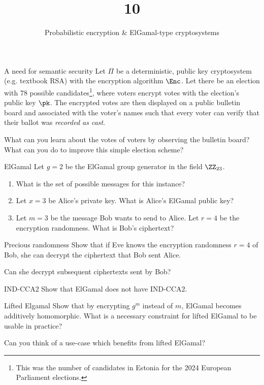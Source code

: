 \documentclass{practice}
\title{10}
\subtitle{Probabilistic encryption \& ElGamal-type cryptosystems}
\date{\DTMdate{2024-11-13}}
\begin{document}
\maketitle

\begin{task}{A need for semantic security}
  Let $\Pi$ be a deterministic, public key cryptosystem (e.g. textbook RSA) with the encryption algorithm $\Enc$.
  Let there be an election with $78$ possible candidates\footnote{This was the number of candidates in Estonia for the 2024 European Parliament elections.}, where voters encrypt votes with the election's public key $\pk$.
  The encrypted votes are then displayed on a public bulletin board and associated with the voter's names such that every voter can verify that their ballot was \emph{recorded as cast}.

  What can you learn about the votes of voters by observing the bulletin board?
  What can you do to improve this simple election scheme?
\end{task}

\begin{task}{ElGamal}
  Let $g = 2$ be the ElGamal group generator in the field $\ZZ_{23}$.
  \begin{enumerate}
    \item What is the set of possible messages for this instance?
    \item Let $x = 3$ be Alice's private key.
    What is Alice's ElGamal public key?
    \item Let $m = 3$ be the message Bob wants to send to Alice.
    Let $r = 4$ be the encryption randomness.
    What is Bob's ciphertext?
  \end{enumerate}
\end{task}

\begin{task}{Precious randomness}
  Show that if Eve knows the encryption randomness $r=4$ of Bob, she can decrypt the ciphertext that Bob sent Alice.

  Can she decrypt subsequent ciphertexts sent by Bob?
\end{task}

\begin{task}{IND-CCA2}
  Show that ElGamal does not have IND-CCA2.
\end{task}

\begin{task}{Lifted Elgamal}
  Show that by encrypting $g^m$ instead of $m$, ElGamal becomes additively homomorphic.
  What is a necessary constraint for lifted ElGamal to be usable in practice?
  
  Can you think of a use-case which benefits from lifted ElGamal?
\end{task}
\end{document}
